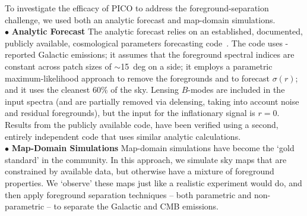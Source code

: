 \documentclass[PICOReport.tex]{subfiles}
\begin{document}
To investigate the efficacy of PICO to address the foreground-separation challenge, we used both an analytic forecast and map-domain simulations. \\ 
%
\noindent$\bullet$ {\bf Analytic Forecast} \hspace{0.1in} The analytic forecast relies on an established, documented, publicly available, cosmological parameters forecasting code~\citep{errard_and_finney}. The code uses \planck -reported Galactic emissions; it assumes that the foreground spectral indices are constant across patch sizes of $\sim$15~deg on a side; it employs a parametric maximum-likelihood approach to remove the foregrounds and to forecast $\sigma(r)$; and it uses the cleanest 60\% of the sky. Lensing $B$-modes are included in the input spectra (and are partially removed via delensing, taking into account noise and residual foregrounds), but the input for the inflationary signal is $r=0$.  Results from the publicly available code, have been verified using a second, entirely independent code that uses similar analytic calculations.  \\
%
%
\noindent$\bullet$ {\bf Map-Domain Simulations} \hspace{0.1in} Map-domain simulations have become the `gold standard' in the community. In this approach, we simulate sky maps that are constrained by available data, but otherwise have a mixture of foreground properties. We `observe' these maps just like a realistic experiment would do, and then apply foreground separation techniques -- both parametric and non-parametric -- to separate the Galactic and CMB emissions. 
\end{document}
